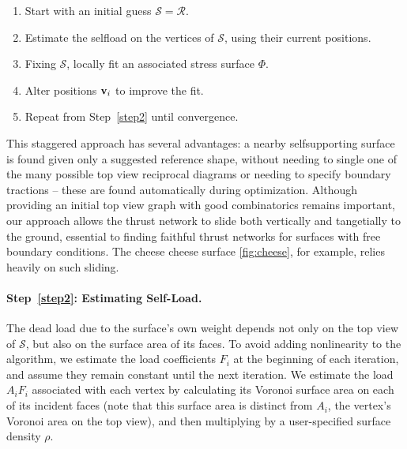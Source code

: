 \documentclass[review]{acmsiggraph}
\def\SS{{\mathcal S}}
\def\RR{{\mathcal R}}
\begin{document}
\begin{enumerate}\itemsep-\parsep\setcounter{enumi}{-1}

\item Start with an initial guess $\SS = \RR$.

\item \label{step2} Estimate the self\dash load on the vertices of $\SS$, 
using their current positions.

\item \label{step3} Fixing $\SS$, locally fit an associated stress surface $\Phi$.

\item \label{step4} Alter positions ${\mathbf v}_i$ to improve the fit.

\item Repeat from Step~\ref{step2} until convergence.

\end{enumerate}

This staggered approach has several advantages: a nearby self\dash supporting surface
is found given only a suggested reference shape, without needing to single one of
the many possible top view reciprocal diagrams or needing to specify boundary
tractions -- these are found automatically during optimization. Although providing
an initial top view graph with good combinatorics remains important, our approach
allows the thrust network to slide both vertically and tangetially to the ground,
essential to finding faithful thrust networks for surfaces with free boundary conditions.
The cheese cheese surface \ref{fig:cheese}, for example, relies heavily on such sliding.

\paragraph{Step~\ref{step2}: Estimating Self-Load.}

The dead load due to the surface's own weight depends not only on the top 
view of $\SS$, but also on the surface area of its faces. To avoid adding 
nonlinearity to the algorithm, we estimate the load coefficients $F_i$ at 
the beginning of each iteration, and assume they remain constant until the 
next iteration. We estimate the load $A_iF_i$ associated with each 
vertex by calculating its Voronoi surface area on each of its incident faces 
(note that this surface area is distinct from $A_i$, the vertex's Voronoi 
area on the top view), and then multiplying by a user-specified surface density $\rho$.
\end{document}
